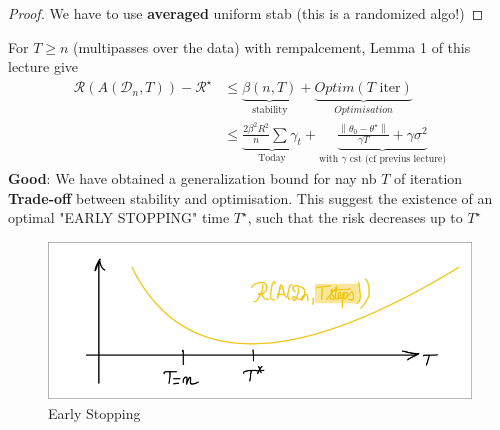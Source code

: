 \begin{proof}
    We have to use \textbf{averaged} uniform stab (this is a randomized algo!)
\end{proof}





\item For $ T \geq n $ (multipasses over the data) with rempalcement, Lemma 1 of this lecture give 
\begin{align*}
    \mathcal{R}(A(\mathcal{D}_n, T)) - \mathcal{R}^\star 
        &\leq \underbrace{\beta (n,T)}_{\text{stability}} + \underbrace{Optim(T \text{ iter})}_{Optimisation} \\
        &\leq \underbrace{\frac{2 \beta ^2 R^2}{n }\sum_{}^{}\gamma _t}_{\text{Today}} + \underbrace{\frac{\left\| \theta _0 - \theta ^\star  \right\| }{\gamma T } + \gamma \sigma ^2}_{\text{with } \gamma \text{ cst (cf previus lecture)} }
\end{align*}
\textbf{Good}: We have obtained a generalization bound for nay nb $ T $ of iteration \\
\textbf{Trade-off} between stability and optimisation. This suggest the existence of an optimal "EARLY STOPPING" time $ T^\star  $, such that the risk decreases up to $ T^\star  $ 

\begin{figure}[!h]
    \centering
    \includegraphics[width=.75\textwidth]{figs/early_stoping.png}
    \caption{Early Stopping}
\end{figure}

